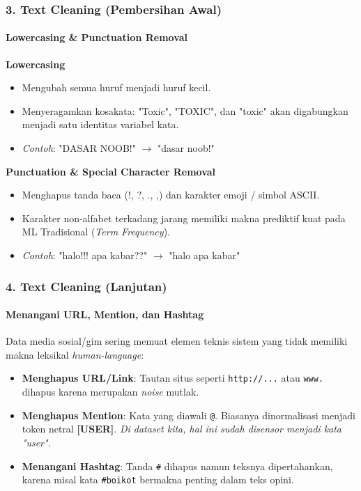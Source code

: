 \documentclass[t,aspectratio=169,xcolor=dvipsnames]{beamer}
\begin{document}
\begin{frame}
    \frametitle{3. Text Cleaning (Pembersihan Awal)}
    \framesubtitle{Lowercasing \& Punctuation Removal}
    \small
    \textbf{Lowercasing}
    \begin{itemize}
        \item Mengubah semua huruf menjadi huruf kecil.
        \item Menyeragamkan kosakata: "Toxic", "TOXIC", dan "toxic" akan digabungkan menjadi satu identitas variabel kata.
        \item \textit{Contoh}: "DASAR NOOB!" $\rightarrow$ "dasar noob!"
    \end{itemize}
    
    \vspace{0.3cm}
    \textbf{Punctuation \& Special Character Removal}
    \begin{itemize}
        \item Menghapus tanda baca (!, ?, ., ,) dan karakter emoji / simbol ASCII.
        \item Karakter non-alfabet terkadang jarang memiliki makna prediktif kuat pada ML Tradisional (\textit{Term Frequency}).
        \item \textit{Contoh}: "halo!!! apa kabar??" $\rightarrow$ "halo apa kabar"
    \end{itemize}
\end{frame}

\begin{frame}
    \frametitle{4. Text Cleaning (Lanjutan)}
    \framesubtitle{Menangani URL, Mention, dan Hashtag}
    \small
    Data media sosial/gim sering memuat elemen teknis sistem yang tidak memiliki makna leksikal \textit{human-language}:
    \vspace{0.2cm}
    \begin{itemize}
        \item \textbf{Menghapus URL/Link}: Tautan situs seperti \texttt{http://...} atau \texttt{www.} dihapus karena merupakan \textit{noise} mutlak.
        \item \textbf{Menghapus Mention}: Kata yang diawali \texttt{@}. Biasanya dinormalisasi menjadi token netral \textbf{[USER]}. \textit{Di dataset kita, hal ini sudah disensor menjadi kata "user"}.
        \item \textbf{Menangani Hashtag}: Tanda \texttt{\#} dihapus namun teksnya dipertahankan, karena misal kata \texttt{\#boikot} bermakna penting dalam teks opini.
    \end{itemize}
\end{frame}
\end{document}
